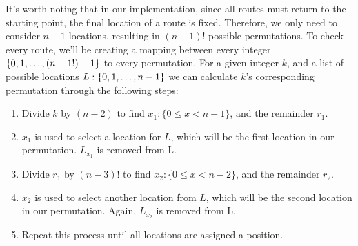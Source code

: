\noindent
It's worth noting that in our implementation, since all routes must return to the starting point, the final location
of a route is fixed.
Therefore, we only need to consider $n-1$ locations, resulting in $(n-1)!$ possible permutations.
To check every route, we'll be creating a mapping between every integer $\{0, 1, \mathellipsis, (n-1!)-1\}$ to every
permutation.
For a given integer $k$, and a list of possible locations $L: \{0, 1, \mathellipsis, n-1\}$ we can calculate $k$'s
corresponding permutation through the following steps:
\begin{enumerate}
    \item Divide $k$ by $(n-2)$ to find $x_1: \{0\leq x<n-1\}$, and the remainder $r_1$.
    \item $x_1$ is used to select a location for $L$, which will be the first location in our permutation. $L_{x_1}$ is
    removed from L.
    \item Divide $r_1$ by $(n-3)!$ to find $x_2: \{0\leq x<n-2\}$, and the remainder $r_2$.
    \item $x_2$ is used to select another location from $L$, which will be the second location in our permutation.
    Again, $L_{x_2}$ is removed from L.
    \item Repeat this process until all locations are assigned a position.
\end{enumerate}

